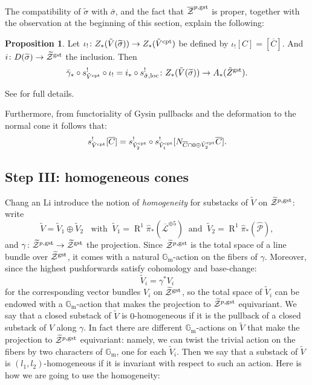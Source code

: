 \documentclass[11pt]{amsart}
\newcommand{\pazocal}{\mathcal}
\newcommand{\tZ}{\widetilde{\pazocal Z}}
\newcommand{\oZp}{\overline{\mathcal Z}^{p,\rm{gst}}}
\renewcommand{\to}{\rightarrow}
\newcommand{\Gm}{\mathbb{G}_{\text{m}}}
\newcommand{\hL}{\overline{\mathcal{L}}}
\theoremstyle{definition}
\newtheorem{prop}[thm]{Proposition}
\theoremstyle{definition}
\begin{document}
 The compatibility of $\tilde\sigma$ with $\bar\sigma$, and the fact that $\oZp$ is proper, together with the observation at the beginning of this section, explain the following:
 \begin{prop}
 Let $\iota_{!}\colon Z_*(\tilde{V}(\widetilde{\sigma}))\to Z_*(\tilde{V}^{\rm{cpt}})$ be defined by 
 $\iota_{!}[C]=[\overline{C}].$ And $i\colon D(\widetilde{\sigma})\to \tZ^{\rm{gst}}$ the inclusion. Then
 \[\bar{\gamma}_*\circ s^{!}_{\tilde{V}^{\rm{cpt}}}\circ\iota_{!}=i_*\circ s^{!}_{\tilde\sigma,\rm{loc}}\colon  Z_*(\tilde{V}(\widetilde{\sigma}))\to A_*(\tilde{Z}^{\rm{gst}}).\]
 \end{prop}
 See \cite[Proposition~6.4]{CL} for full details.
 
 Furthermore, from functoriality of Gysin pullbacks and the deformation to the normal cone it follows that:
 \[s^!_{\tilde V^{\rm{cpt}}}[\overline C]=s^!_{\tilde V_2^{\rm{cpt}}}\circ s^!_{\tilde V_1^{\rm{cpt}}}[N_{\overline C\cap 0\oplus\tilde V_2^{\rm{cpt}}}\overline C].\]
 
 \subsection*{Step III: homogeneous cones}
Chang an Li introduce the notion of \emph{homogeneity} for substacks of $\tilde V$ on $\tZ^{p,\rm{gst}}$: write 
\[\tilde V=\tilde V_1\oplus\tilde V_2\;\;\text{ with} \;\;\tilde V_1=\operatorname{R}^1\hat{\pi}_*(\hL^{\oplus 5})\;\; \text{and}\;\; \tilde V_2=\operatorname{R}^1\hat{\pi}_*(\widehat{\mathcal P}),\]
 and $\gamma\colon \tZ^{p,\rm{gst}}\to\tZ^{\rm{gst}}$ the projection. Since $\tZ^{p,\rm{gst}}$ is the total space of a line bundle over $\tZ^{\rm{gst}}$, it comes with a natural $\Gm$-action on the fibers of $\gamma$. Moreover, since the highest pushforwards satisfy cohomology and base-change:
 \[\tilde V_i=\gamma^*V_i\]
 for the corresponding vector bundles $V_i$ on $\tZ^{\rm{gst}}$, so the total space of $\tilde V_i$ can be endowed with a $\Gm$-action that makes the projection to $\tZ^{p,\rm{gst}}$ equivariant. We say that a closed substack of $\tilde V$ is $0$-homogeneous if it is the pullback of a closed substack of $V$ along $\gamma$. In fact there are different $\Gm$-actions on $\tilde V$ that make the projection to $\tZ^{p,\rm{gst}}$ equivariant: namely, we can twist the trivial action on the fibers by two characters of $\Gm$, one for each $\tilde V_i$. Then we say that a substack of $\tilde V$ is $(l_1,l_2)$-homogeneous if it is invariant with respect to such an action. Here is how we are going to use the homogeneity:
\end{document}

